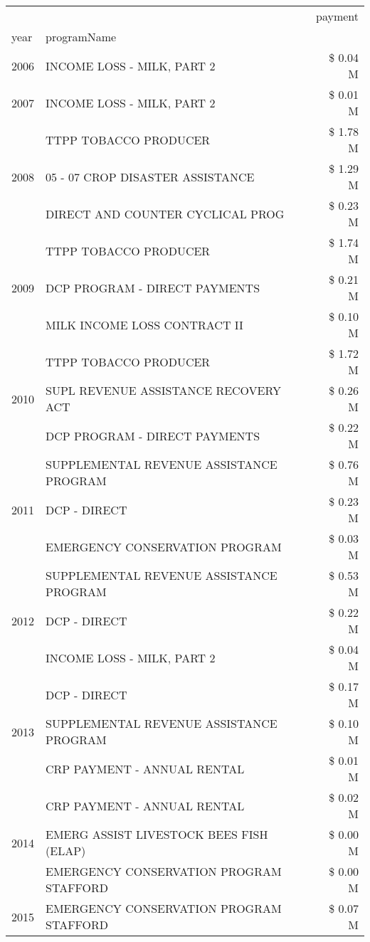 \begin{tabular}{llr}
\toprule
 &  & payment \\
year & programName &  \\
\midrule
2006 & INCOME LOSS - MILK, PART 2 & \$ 0.04 M \\
\cline{1-3}
2007 & INCOME LOSS - MILK, PART 2 & \$ 0.01 M \\
\cline{1-3}
\multirow[t]{3}{*}{2008} & TTPP TOBACCO PRODUCER & \$ 1.78 M \\
 & 05 - 07 CROP DISASTER ASSISTANCE & \$ 1.29 M \\
 & DIRECT AND COUNTER CYCLICAL PROG & \$ 0.23 M \\
\cline{1-3}
\multirow[t]{3}{*}{2009} & TTPP TOBACCO PRODUCER & \$ 1.74 M \\
 & DCP PROGRAM - DIRECT PAYMENTS & \$ 0.21 M \\
 & MILK INCOME LOSS CONTRACT II & \$ 0.10 M \\
\cline{1-3}
\multirow[t]{3}{*}{2010} & TTPP TOBACCO PRODUCER & \$ 1.72 M \\
 & SUPL REVENUE ASSISTANCE RECOVERY ACT & \$ 0.26 M \\
 & DCP PROGRAM - DIRECT PAYMENTS & \$ 0.22 M \\
\cline{1-3}
\multirow[t]{3}{*}{2011} & SUPPLEMENTAL REVENUE ASSISTANCE PROGRAM & \$ 0.76 M \\
 & DCP - DIRECT & \$ 0.23 M \\
 & EMERGENCY CONSERVATION PROGRAM & \$ 0.03 M \\
\cline{1-3}
\multirow[t]{3}{*}{2012} & SUPPLEMENTAL REVENUE ASSISTANCE PROGRAM & \$ 0.53 M \\
 & DCP - DIRECT & \$ 0.22 M \\
 & INCOME LOSS - MILK, PART 2 & \$ 0.04 M \\
\cline{1-3}
\multirow[t]{3}{*}{2013} & DCP - DIRECT & \$ 0.17 M \\
 & SUPPLEMENTAL REVENUE ASSISTANCE PROGRAM & \$ 0.10 M \\
 & CRP PAYMENT - ANNUAL RENTAL & \$ 0.01 M \\
\cline{1-3}
\multirow[t]{3}{*}{2014} & CRP PAYMENT - ANNUAL RENTAL & \$ 0.02 M \\
 & EMERG ASSIST LIVESTOCK BEES FISH (ELAP) & \$ 0.00 M \\
 & EMERGENCY CONSERVATION PROGRAM STAFFORD & \$ 0.00 M \\
\cline{1-3}
\multirow[t]{3}{*}{2015} & EMERGENCY CONSERVATION PROGRAM STAFFORD & \$ 0.07 M \\

\end{tabular}
